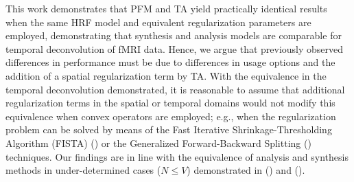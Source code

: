 
This work demonstrates that PFM and TA yield practically identical results when the same HRF model and equivalent regularization parameters are employed, demonstrating that synthesis and analysis models are comparable for temporal deconvolution of fMRI data. Hence, we argue that previously observed differences in performance must be due to differences in usage options and the addition of a spatial regularization term by TA. With the equivalence in the temporal deconvolution demonstrated, it is reasonable to assume that additional regularization terms in the spatial or temporal domains would not modify this equivalence when convex operators are employed; e.g., when the regularization problem can be solved by means of the Fast Iterative Shrinkage-Thresholding Algorithm (FISTA) (\citealt{Beck2009FastIterativeShrinkage}) or the Generalized Forward-Backward Splitting (\citealt{Raguet2013GeneralizedForwardBackward}) techniques. Our findings are in line with the equivalence of analysis and synthesis methods in under-determined cases (\(N \leq V\)) demonstrated in (\citealt{Elad2007Analysisversussynthesis}) and (\citealt{ortelli2019synthesis}).

